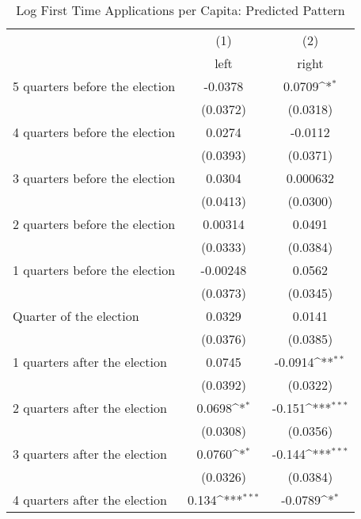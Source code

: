 \begin{table}[htbp]\centering
\def\sym#1{\ifmmode^{#1}\else\(^{#1}\)\fi}
\caption{Log First Time Applications per Capita: Predicted Pattern}
\begin{tabular}{l*{2}{c}}
\hline\hline
                    &\multicolumn{1}{c}{(1)}&\multicolumn{1}{c}{(2)}\\
                    &\multicolumn{1}{c}{left}&\multicolumn{1}{c}{right}\\
\hline
 5 quarters before the election&     -0.0378         &      0.0709\sym{*}  \\
                    &    (0.0372)         &    (0.0318)         \\
[1em]
 4 quarters before the election&      0.0274         &     -0.0112         \\
                    &    (0.0393)         &    (0.0371)         \\
[1em]
 3 quarters before the election&      0.0304         &    0.000632         \\
                    &    (0.0413)         &    (0.0300)         \\
[1em]
 2 quarters before the election&     0.00314         &      0.0491         \\
                    &    (0.0333)         &    (0.0384)         \\
[1em]
 1 quarters before the election&    -0.00248         &      0.0562         \\
                    &    (0.0373)         &    (0.0345)         \\
[1em]
Quarter of the election&      0.0329         &      0.0141         \\
                    &    (0.0376)         &    (0.0385)         \\
[1em]
 1 quarters after the election&      0.0745         &     -0.0914\sym{**} \\
                    &    (0.0392)         &    (0.0322)         \\
[1em]
 2 quarters after the election&      0.0698\sym{*}  &      -0.151\sym{***}\\
                    &    (0.0308)         &    (0.0356)         \\
[1em]
 3 quarters after the election&      0.0760\sym{*}  &      -0.144\sym{***}\\
                    &    (0.0326)         &    (0.0384)         \\
[1em]
 4 quarters after the election&       0.134\sym{***}&     -0.0789\sym{*}  \\

\end{tabular}
\end{table}
